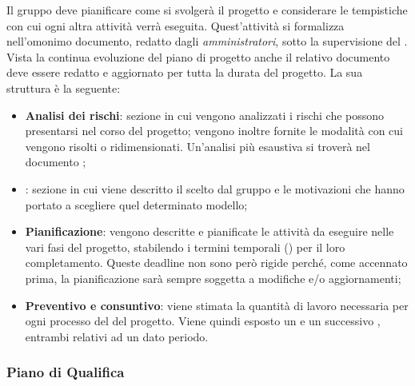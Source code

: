 Il gruppo deve pianificare come si svolgerà il progetto e considerare le tempistiche con cui ogni altra attività verrà
eseguita. Quest'attività si formalizza nell'omonimo documento, redatto dagli \emph{amministratori}, sotto la
supervisione del \emph{}. Vista la continua evoluzione del piano di progetto anche
il relativo documento deve essere redatto e aggiornato per tutta la durata del progetto. La sua struttura è la seguente:
\begin{itemize}
    \item \textbf{Analisi dei rischi}: sezione in cui vengono analizzati i rischi che possono presentarsi nel corso del
    progetto; vengono inoltre fornite le modalità con cui vengono risolti o ridimensionati. Un'analisi più esaustiva
    si troverà nel documento ;
    \item \textbf{}: sezione in cui viene descritto il 
    scelto dal gruppo e le motivazioni che hanno portato a scegliere quel determinato modello;
    \item \textbf{Pianificazione}: vengono descritte e pianificate le attività da eseguire nelle vari fasi del progetto,
    stabilendo i termini temporali () per il loro completamento. Queste deadline non sono però
    rigide perché, come accennato prima, la pianificazione sarà sempre soggetta a modifiche e/o aggiornamenti;
    \item \textbf{Preventivo e consuntivo}: viene stimata la quantità di lavoro necessaria per ogni processo del
     del progetto. Viene quindi esposto un  e un successivo
    , entrambi relativi ad un dato periodo.
\end{itemize}

\subsubsection{Piano di Qualifica}

